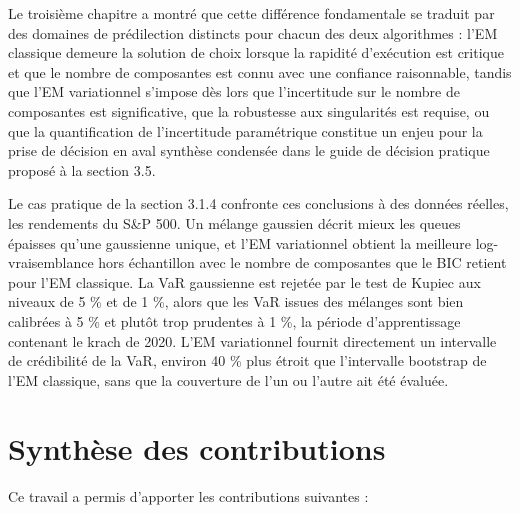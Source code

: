 Le troisième chapitre a montré que cette différence fondamentale se traduit par des domaines de prédilection distincts pour chacun des deux algorithmes : l'EM classique demeure la solution de choix lorsque la rapidité d'exécution est critique et que le nombre de composantes est connu avec une confiance raisonnable, tandis que l'EM variationnel s'impose dès lors que l'incertitude sur le nombre de composantes est significative, que la robustesse aux singularités est requise, ou que la quantification de l'incertitude paramétrique constitue un enjeu pour la prise de décision en aval  synthèse condensée dans le guide de décision pratique proposé à la section 3.5.

Le cas pratique de la section 3.1.4 confronte ces conclusions à des données réelles, les rendements du S\&P 500. Un mélange gaussien décrit mieux les queues épaisses qu'une gaussienne unique, et l'EM variationnel obtient la meilleure log-vraisemblance hors échantillon avec le nombre de composantes que le BIC retient pour l'EM classique. La VaR gaussienne est rejetée par le test de Kupiec aux niveaux de 5 \% et de 1 \%, alors que les VaR issues des mélanges sont bien calibrées à 5 \% et plutôt trop prudentes à 1 \%, la période d'apprentissage contenant le krach de 2020. L'EM variationnel fournit directement un intervalle de crédibilité de la VaR, environ 40 \% plus étroit que l'intervalle bootstrap de l'EM classique, sans que la couverture de l'un ou l'autre ait été évaluée.

\section*{Synthèse des contributions}
Ce travail a permis d'apporter les contributions suivantes :

